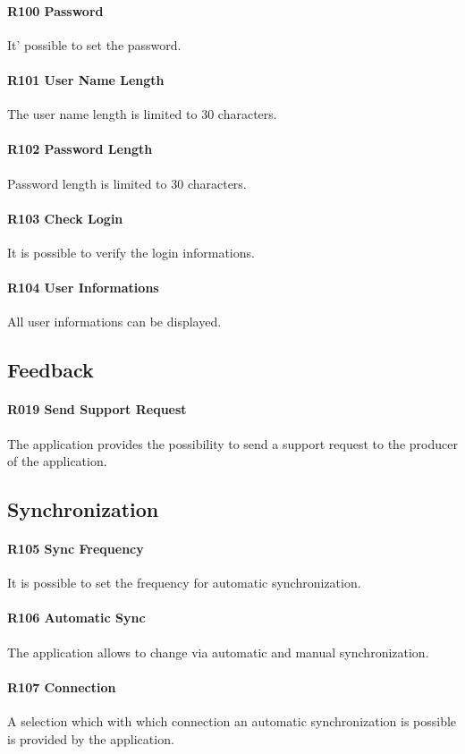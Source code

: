 \paragraph{R100 Password}
It' possible to set the password.
\paragraph{R101 User Name Length}
The user name length is limited to 30 characters.
\paragraph{R102 Password Length}
Password length is limited to 30 characters.
\paragraph{R103 Check Login}
It is possible to verify the login informations.
\paragraph{R104 User Informations}
All user informations can be displayed.

\subsection{Feedback}
\paragraph{R019 Send Support Request}
The application provides the possibility to send a support request to the producer of the application.

\subsection{Synchronization}
\paragraph{R105 Sync Frequency}
It is possible to set the frequency for automatic synchronization.
\paragraph{R106 Automatic Sync}
The application allows to change via automatic and manual synchronization.
\paragraph{R107 Connection}
A selection which with which connection an automatic synchronization is possible is provided by the application.

